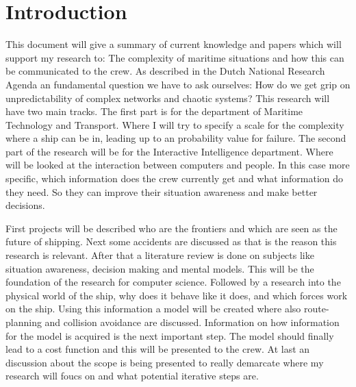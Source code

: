 \section*{Introduction}
\label{sec:introduction}

\noindent This document will give a summary of current knowledge and papers which will support my research to: The complexity of maritime situations and how this can be communicated to the crew.
As described in the Dutch National Research Agenda an fundamental question we have to ask ourselves: How do we get grip on unpredictability of complex networks and chaotic systems? 
This research will have two main tracks. The first part is for the department of Maritime Technology and Transport. Where I will try to specify a scale for the complexity where a ship can be in, leading up to an probability value for failure. The second part of the research will be for the Interactive Intelligence department. Where will be looked at the interaction between computers and people. In this case more specific, which information does the crew currently get and what information do they need. So they can improve their situation awareness and make better decisions.

First projects will be described who are the frontiers and which are seen as the future of shipping. Next some accidents are discussed as that is the reason this research is relevant.
After that a literature review is done on subjects like situation awareness, decision making and mental models. This will be the foundation of the research for computer science. 
Followed by a research into the physical world of the ship, why does it behave like it does, and which forces work on the ship. Using this information a model will be created where also route-planning and collision avoidance are discussed. 
Information on how information for the model is acquired is the next important step. The model should finally lead to a cost function and this will be presented to the crew. 
At last an discussion about the scope is being presented to really demarcate where my research will foucs on and what potential iterative steps are. 
